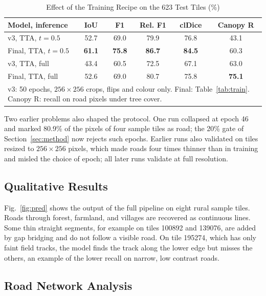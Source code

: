\documentclass{ieeeaccess}
\begin{document}
\begin{table}[t]
\caption{Effect of the Training Recipe on the 623 Test Tiles (\%)}
\label{tab:recipe}
\setlength{\tabcolsep}{3pt}
\tablebodyfont
\begin{tabular}{|l|c|c|c|c|c|}
\hline
Model, inference & IoU & F1 & Rel. F1 & clDice & Canopy R \\
\hline
v3, TTA, $t = 0.5$ & 52.7 & 69.0 & 79.9 & 76.8 & 43.1 \\
Final, TTA, $t = 0.5$ & \textbf{61.1} & \textbf{75.8} & \textbf{86.7} & \textbf{84.5} & 60.3 \\
v3, TTA, full & 43.4 & 60.5 & 72.5 & 67.1 & 63.0 \\
Final, TTA, full & 52.6 & 69.0 & 80.7 & 75.8 & \textbf{75.1} \\
\hline
\multicolumn{6}{p{215pt}}{v3: 50 epochs, $256 \times 256$ crops, flips and colour only. Final: Table~\ref{tab:train}. Canopy R: recall on road pixels under tree cover.}
\end{tabular}
\end{table}

Two earlier problems also shaped the protocol. One run collapsed at epoch 46 and marked 80.9\% of the pixels of four sample tiles as road; the 20\% gate of Section~\ref{sec:method} now rejects such epochs. Earlier runs also validated on tiles resized to $256 \times 256$ pixels, which made roads four times thinner than in training and misled the choice of epoch; all later runs validate at full resolution.

\subsection{Qualitative Results}

Fig.~\ref{fig:pred} shows the output of the full pipeline on eight rural sample tiles. Roads through forest, farmland, and villages are recovered as continuous lines. Some thin straight segments, for example on tiles 100892 and 139076, are added by gap bridging and do not follow a visible road. On tile 195274, which has only faint field tracks, the model finds the track along the lower edge but misses the others, an example of the lower recall on narrow, low contrast roads.

\subsection{Road Network Analysis}
\end{document}
